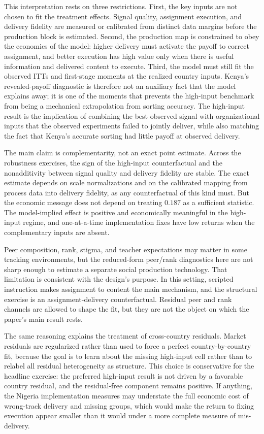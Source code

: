 \documentclass[11pt]{article}
\begin{document}
This interpretation rests on three restrictions. First, the key inputs are not chosen to fit the treatment effects. Signal quality, assignment execution, and delivery fidelity are measured or calibrated from distinct data margins before the production block is estimated. Second, the production map is constrained to obey the economics of the model: higher delivery must activate the payoff to correct assignment, and better execution has high value only when there is useful information and delivered content to execute. Third, the model must still fit the observed ITTs and first-stage moments at the realized country inputs. Kenya's revealed-payoff diagnostic is therefore not an auxiliary fact that the model explains away; it is one of the moments that prevents the high-input benchmark from being a mechanical extrapolation from sorting accuracy. The high-input result is the implication of combining the best observed signal with organizational inputs that the observed experiments failed to jointly deliver, while also matching the fact that Kenya's accurate sorting had little payoff at observed delivery.

The main claim is complementarity, not an exact point estimate. Across the robustness exercises, the sign of the high-input counterfactual and the nonadditivity between signal quality and delivery fidelity are stable. The exact estimate depends on scale normalizations and on the calibrated mapping from process data into delivery fidelity, as any counterfactual of this kind must. But the economic message does not depend on treating $0.187$ as a sufficient statistic. The model-implied effect is positive and economically meaningful in the high-input regime, and one-at-a-time implementation fixes have low returns when the complementary inputs are absent.

Peer composition, rank, stigma, and teacher expectations may matter in some tracking environments, but the reduced-form peer/rank diagnostics here are not sharp enough to estimate a separate social production technology. That limitation is consistent with the design's purpose. In this setting, scripted instruction makes assignment to content the main mechanism, and the structural exercise is an assignment-delivery counterfactual. Residual peer and rank channels are allowed to shape the fit, but they are not the object on which the paper's main result rests.

The same reasoning explains the treatment of cross-country residuals. Market residuals are regularized rather than used to force a perfect country-by-country fit, because the goal is to learn about the missing high-input cell rather than to relabel all residual heterogeneity as structure. This choice is conservative for the headline exercise: the preferred high-input result is not driven by a favorable country residual, and the residual-free component remains positive. If anything, the Nigeria implementation measures may understate the full economic cost of wrong-track delivery and missing groups, which would make the return to fixing execution appear smaller than it would under a more complete measure of mis-delivery.
\end{document}
